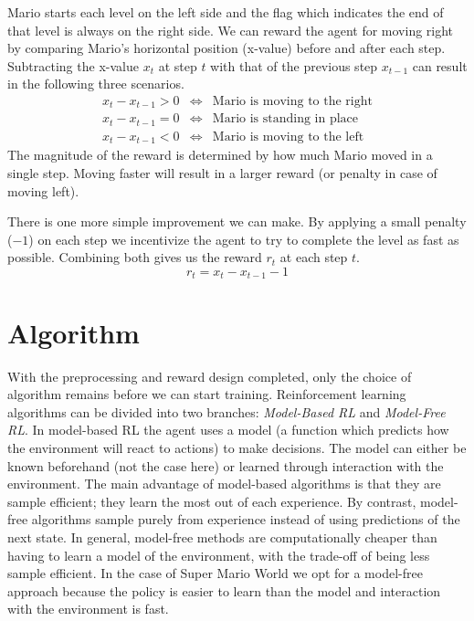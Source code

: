 \documentclass[a4paper]{article}
\begin{document}
Mario starts each level on the left side and the flag which indicates the end of that level is always on the right side.
We can reward the agent for moving right by comparing Mario's horizontal position (x-value) before and after each step.
Subtracting the x-value $x_{t}$ at step $t$ with that of the previous step $x_{t-1}$ can result in the following three scenarios.
\begin{eqnarray*}
    x_{t} - x_{t-1} > 0&\iff&\text{Mario is moving to the right}\\
    x_{t} - x_{t-1} = 0&\iff&\text{Mario is standing in place}\\
    x_{t} - x_{t-1} < 0&\iff&\text{Mario is moving to the left}
\end{eqnarray*}
The magnitude of the reward is determined by how much Mario moved in a single step.
Moving faster will result in a larger reward (or penalty in case of moving left).

There is one more simple improvement we can make.
By applying a small penalty ($-1$) on each step we incentivize the agent to try to complete the level as fast as possible.
Combining both gives us the reward $r_{t}$ at each step $t$.
\[r_{t} = x_{t} - x_{t-1} - 1\]


\section{Algorithm} \label{s:algorithm}
With the preprocessing and reward design completed, only the choice of algorithm remains before we can start training.
Reinforcement learning algorithms can be divided into two branches: \emph{Model-Based RL} and \emph{Model-Free RL}.
In model-based RL the agent uses a model (a function which predicts how the environment will react to actions) to make decisions.
The model can either be known beforehand (not the case here) or learned through interaction with the environment.
The main advantage of model-based algorithms is that they are sample efficient; they learn the most out of each experience.
By contrast, model-free algorithms sample purely from experience instead of using predictions of the next state.
In general, model-free methods are computationally cheaper than having to learn a model of the environment, with the trade-off of being less sample efficient.
In the case of Super Mario World we opt for a model-free approach because the policy is easier to learn than the model and interaction with the environment is fast.
\end{document}
